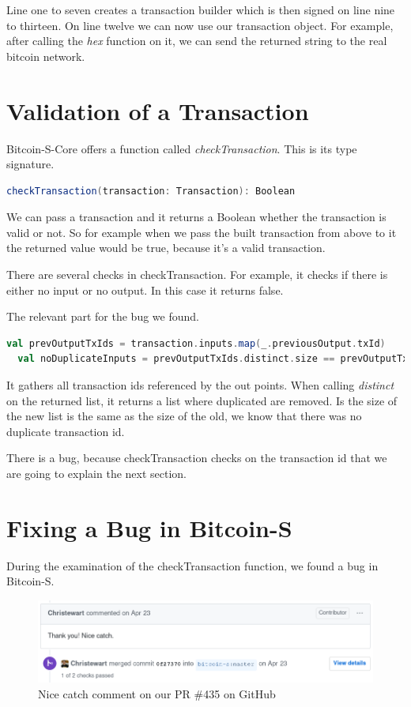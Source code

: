 Line one to seven creates a transaction builder which is then signed on line nine to thirteen.
On line twelve we can now use our transaction object.
For example, after calling the \emph{hex} function on it, we can send the returned string to the real bitcoin network.


\section{Validation of a Transaction}

Bitcoin-S-Core offers a function called \emph{checkTransaction}.
This is its type signature.
\begin{lstlisting}[language=scala]
  checkTransaction(transaction: Transaction): Boolean
\end{lstlisting}
We can pass a transaction and it returns a Boolean whether the transaction is valid or not.
So for example when we pass the built transaction from above to it the returned value would be true, because it's a valid transaction.

There are several checks in checkTransaction.
For example, it checks if there is either no input or no output.
In this case it returns false.

The relevant part for the bug we found.
\begin{lstlisting}[language=scala]
  val prevOutputTxIds = transaction.inputs.map(_.previousOutput.txId)
  val noDuplicateInputs = prevOutputTxIds.distinct.size == prevOutputTxIds.size
\end{lstlisting}

It gathers all transaction ids referenced by the out points.
When calling \emph{distinct} on the returned list, it returns a list where duplicated are removed.
Is the size of the new list is the same as the size of the old, we know that there was no duplicate transaction id.

There is a bug, because checkTransaction checks on the transaction id that we are going to explain the next section.


\section{Fixing a Bug in Bitcoin-S}

During the examination of the checkTransaction function, we found a bug in Bitcoin-S.

\begin{figure}[H]
	\centering
		\includegraphics[scale=0.5]{images/bitcoin-s-pr-comment.png}
	\caption{Nice catch comment on our PR \#435 on GitHub}
	\label{fig:output1}
\end{figure}

